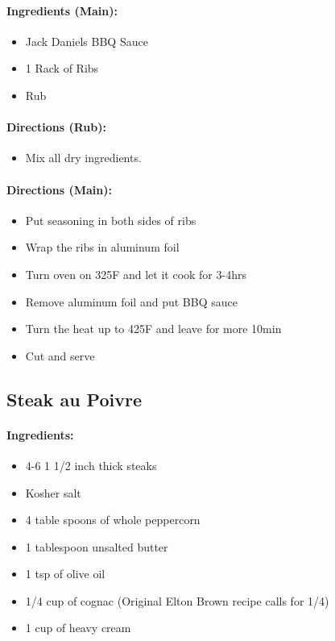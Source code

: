 \documentclass{article}
\begin{document}
\paragraph{Ingredients (Main):}
\begin{itemize}
    \item Jack Daniels BBQ Sauce
    \item 1 Rack of Ribs
    \item Rub
\end{itemize}  

\paragraph{Directions (Rub):}
\begin{itemize}
    \item Mix all dry ingredients.
\end{itemize}  

\paragraph{Directions (Main):}
\begin{itemize}
    \item Put seasoning in both sides of ribs
    \item Wrap the ribs in aluminum foil
    \item Turn oven on 325F and let it cook for 3-4hrs
    \item Remove aluminum foil and put BBQ sauce
    \item Turn the heat up to 425F and leave for more 10min
    \item Cut and serve
\end{itemize} 

\subsection{Steak au Poivre}

\paragraph{Ingredients:}
\begin{itemize}
    \item 4-6 1 1/2 inch thick steaks
    \item Kosher salt
    \item 4 table spoons of whole peppercorn
    \item 1 tablespoon unsalted butter
    \item 1 tsp of olive oil
    \item 1/4 cup of cognac (Original Elton Brown recipe calls for 1/4)
    \item 1 cup of heavy cream
\end{itemize}
\end{document}

